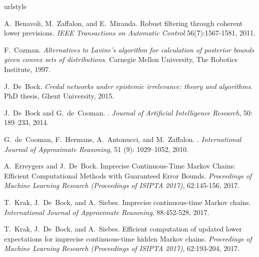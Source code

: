 \documentclass[3p]{elsarticle}
\begin{document}
%
\begin{thebibliography}{8}
\providecommand{\natexlab}[1]{#1}
\providecommand{\url}[1]{\texttt{#1}}
\expandafter\ifx\csname urlstyle\endcsname\relax
  \providecommand{\doi}[1]{doi: #1}\else
  \providecommand{\doi}{doi: \begingroup \urlstyle{rm}\Url}\fi

A.~Benavoli, M.~Zaffalon, and E.~Miranda.
\newblock Robust filtering through coherent lower previsions.
\newblock \emph{IEEE Transactions on Automatic Control} 56(7):1567-1581, 2011.

F.~Cozman.
\newblock \emph{Alternatives to Lavine's algorithm for calculation of posterior
  bounds given convex sets of distributions}.
\newblock Carnegie Mellon University, The Robotics Institute, 1997.

J.~De~Bock.
\newblock \emph{Credal networks under epistemic irrelevance: theory and
  algorithms}.
\newblock PhD thesis, Ghent University, 2015.

J.~De~Bock and G.~de~Cooman.
.
\newblock \emph{Journal of Artificial Intelligence Research}, 50:
  189--233, 2014.

G.~de~Cooman, F.~Hermans, A.~Antonucci, and M.~Zaffalon.
.
\newblock \emph{International Journal of Approximate Reasoning}, 51
  (9): 1029--1052, 2010.

A.~Erreygers and J.~De~Bock.
\newblock Imprecise Continuous-Time {M}arkov Chains: Efficient Computational Methods with Guaranteed Error Bounds.
\newblock \emph{Proceedings of Machine Learning Research (Proceedings of ISIPTA 2017)}, 62:145-156, 2017.

T.~Krak, J.~De~Bock, and A.~Siebes.
\newblock Imprecise continuous-time {M}arkov chains.
\newblock \emph{International Journal of Approximate Reasoning}, 88:452-528, 2017.

T.~Krak, J.~De~Bock, and A.~Siebes.
\newblock Efficient computation of updated lower expectations for imprecise continuous-time hidden {M}arkov chains.
\newblock \emph{Proceedings of Machine Learning Research (Proceedings of ISIPTA 2017)}, 62:193-204, 2017.


\end{thebibliography}
\end{document}
